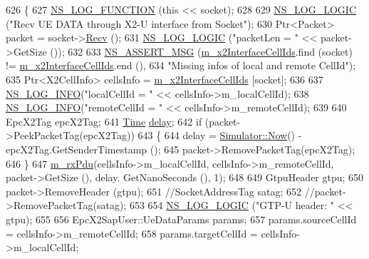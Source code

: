\begin{DoxyCode}
626 \{
627   \hyperlink{log-macros-disabled_8h_a90b90d5bad1f39cb1b64923ea94c0761}{NS\_LOG\_FUNCTION} (\textcolor{keyword}{this} << socket);
628 
629   \hyperlink{group__logging_ga88acd260151caf2db9c0fc84997f45ce}{NS\_LOG\_LOGIC} (\textcolor{stringliteral}{"Recv UE DATA through X2-U interface from Socket"});
630   Ptr<Packet> packet = socket->\hyperlink{classns3_1_1Socket_a8949b1f844aae563446f2f4c5be8827a}{Recv} ();
631   \hyperlink{group__logging_ga88acd260151caf2db9c0fc84997f45ce}{NS\_LOG\_LOGIC} (\textcolor{stringliteral}{"packetLen = "} << packet->GetSize ());
632 
633   \hyperlink{assert_8h_aff5ece9066c74e681e74999856f08539}{NS\_ASSERT\_MSG} (\hyperlink{classns3_1_1EpcX2_ac2a7cd7a712f47a9f429254842762482}{m\_x2InterfaceCellIds}.find (socket) != 
      \hyperlink{classns3_1_1EpcX2_ac2a7cd7a712f47a9f429254842762482}{m\_x2InterfaceCellIds}.end (),
634                  \textcolor{stringliteral}{"Missing infos of local and remote CellId"});
635   Ptr<X2CellInfo> cellsInfo = \hyperlink{classns3_1_1EpcX2_ac2a7cd7a712f47a9f429254842762482}{m\_x2InterfaceCellIds} [socket];
636 
637   \hyperlink{group__logging_gafbd73ee2cf9f26b319f49086d8e860fb}{NS\_LOG\_INFO}(\textcolor{stringliteral}{"localCellId = "} << cellsInfo->m\_localCellId);
638   \hyperlink{group__logging_gafbd73ee2cf9f26b319f49086d8e860fb}{NS\_LOG\_INFO}(\textcolor{stringliteral}{"remoteCellId = "} << cellsInfo->m\_remoteCellId);
639 
640   EpcX2Tag epcX2Tag;
641   \hyperlink{namespacens3_1_1TracedValueCallback_a7ffd3e7c142ffe7c8a1d2db9b8de38ec}{Time} \hyperlink{lte_2model_2fading-traces_2fading__trace__generator_8m_a7964e6aa8f61a9d28973c8267a606ad8}{delay};
642   \textcolor{keywordflow}{if} (packet->PeekPacketTag(epcX2Tag))
643     \{
644       delay = \hyperlink{classns3_1_1Simulator_ac3178fa975b419f7875e7105be122800}{Simulator::Now}() - epcX2Tag.GetSenderTimestamp ();
645       packet->RemovePacketTag(epcX2Tag);
646     \}
647   \hyperlink{classns3_1_1EpcX2_a00f11080fe6a1d7020bfae006445eb59}{m\_rxPdu}(cellsInfo->m\_localCellId, cellsInfo->m\_remoteCellId, packet->GetSize (), delay.
      GetNanoSeconds (), 1);
648 
649   GtpuHeader gtpu;
650   packet->RemoveHeader (gtpu);
651   \textcolor{comment}{//SocketAddressTag satag;}
652   \textcolor{comment}{//packet->RemovePacketTag(satag);}
653 
654   \hyperlink{group__logging_ga88acd260151caf2db9c0fc84997f45ce}{NS\_LOG\_LOGIC} (\textcolor{stringliteral}{"GTP-U header: "} << gtpu);
655 
656   EpcX2SapUser::UeDataParams params;
657   params.sourceCellId = cellsInfo->m\_remoteCellId;
658   params.targetCellId = cellsInfo->m\_localCellId;

\end{DoxyCode}
